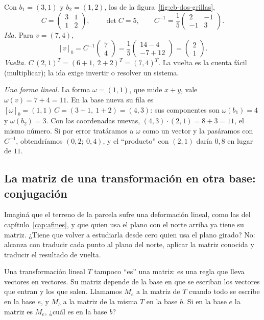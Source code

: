 \begin{ejemplo}\label{ej:cb-oblicua}
Con \(b_1=(3,1)\) y \(b_2=(1,2)\), los de la figura~\ref{fig:cb-dos-grillas},
\[
  C=\begin{pmatrix}3&1\\1&2\end{pmatrix},\qquad \det C=5,\qquad
  C^{-1}=\frac15\begin{pmatrix}2&-1\\-1&3\end{pmatrix}.
\]
\emph{Ida.} Para \(v=(7,4)\),
\[
  [v]_b=C^{-1}\begin{pmatrix}7\\4\end{pmatrix}=\frac15\begin{pmatrix}14-4\\-7+12\end{pmatrix}
  =\begin{pmatrix}2\\1\end{pmatrix}.
\]
\emph{Vuelta.} \(C\,(2,1)^T=(6+1,\ 2+2)^T=(7,4)^T\). La vuelta es la cuenta fácil
(multiplicar); la ida exige invertir o resolver un sistema.

\emph{Una forma lineal.} La forma \(\omega=(1,1)\), que mide \(x+y\), vale
\(\omega(v)=7+4=11\). En la base nueva su fila es \([\omega]_b=(1,1)\,C=(3+1,\ 1+2)=(4,3)\):
sus componentes son \(\omega(b_1)=4\) y \(\omega(b_2)=3\). Con las coordenadas nuevas,
\((4,3)\cdot(2,1)=8+3=11\), el mismo número. Si por error tratáramos a \(\omega\) como un
vector y la pasáramos con \(C^{-1}\), obtendríamos \((0{,}2;\ 0{,}4)\), y el
\enquote{producto} con \((2,1)\) daría \(0{,}8\) en lugar de \(11\).
\end{ejemplo}

\subsection{La matriz de una transformación en otra base: conjugación}\label{sec:semejanza}\label{sec:conjugacion}

Imaginá que el terreno de la parcela sufre una deformación lineal, como las del
capítulo~\ref{cap:afines}, y que quien usa el plano con el norte arriba ya tiene su matriz.
¿Tiene que volver a estudiarla desde cero quien usa el plano girado? No: alcanza con traducir
cada punto al plano del norte, aplicar la matriz conocida y traducir el resultado de vuelta.

Una transformación lineal \(T\) tampoco \enquote{es} una matriz: es una regla que lleva vectores en
vectores. Su matriz depende de la base en que se escriban los vectores que entran y los que
salen. Llamamos \(M_e\) a la matriz de \(T\) cuando todo se escribe en la base \(e\), y \(M_b\)
a la matriz de la misma \(T\) en la base \(b\).
Si en la base \(e\) la matriz es \(M_e\), ¿cuál es en la base \(b\)?

